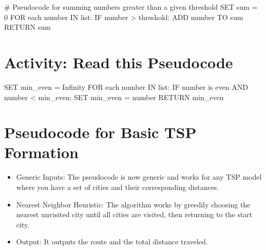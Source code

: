 \documentclass[
  letterpaper,
  DIV=11,
  numbers=noendperiod]{scrreprt}
\newenvironment{Shaded}{\begin{snugshade}}{\end{snugshade}}
\newcommand{\NormalTok}[1]{\textcolor[rgb]{0.00,0.23,0.31}{#1}}
\providecommand{\tightlist}{%
  \setlength{\itemsep}{0pt}\setlength{\parskip}{0pt}}\usepackage{longtable,booktabs,array}
\begin{document}
\begin{Shaded}
\begin{Highlighting}[]
\NormalTok{\# Pseudocode for summing numbers greater than a given threshold}
\NormalTok{SET sum = 0}
\NormalTok{FOR each number IN list:}
\NormalTok{    IF number \textgreater{} threshold:}
\NormalTok{        ADD number TO sum}
\NormalTok{RETURN sum}
\end{Highlighting}
\end{Shaded}

\section{Activity: Read this
Pseudocode}\label{activity-read-this-pseudocode}

\begin{Shaded}
\begin{Highlighting}[]
\NormalTok{SET min\_even = Infinity }
\NormalTok{FOR each number IN list: }
\NormalTok{    IF number is even AND number \textless{} min\_even: }
\NormalTok{        SET min\_even = number }
\NormalTok{RETURN min\_even}
\end{Highlighting}
\end{Shaded}

\section{Pseudocode for Basic TSP
Formation}\label{pseudocode-for-basic-tsp-formation}

\begin{itemize}
\tightlist
\item
  Generic Inputs: The pseudocode is now generic and works for any TSP
  model where you have a set of cities and their corresponding
  distances.
\item
  Nearest Neighbor Heuristic: The algorithm works by greedily choosing
  the nearest unvisited city until all cities are visited, then
  returning to the start city.
\item
  Output: It outputs the route and the total distance traveled.
\end{itemize}
\end{document}
